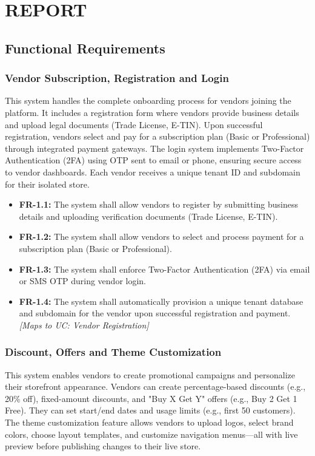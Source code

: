 \chapter{REPORT} \label{ch:procedure}
\section{Functional Requirements}

\subsection{Vendor Subscription, Registration and Login}
This system handles the complete onboarding process for vendors joining the platform. It includes a registration form where vendors provide business details and upload legal documents (Trade License, E-TIN). Upon successful registration, vendors select and pay for a subscription plan (Basic or Professional) through integrated payment gateways. The login system implements Two-Factor Authentication (2FA) using OTP sent to email or phone, ensuring secure access to vendor dashboards. Each vendor receives a unique tenant ID and subdomain for their isolated store.

\begin{itemize}
    \item \textbf{FR-1.1:} The system shall allow vendors to register by submitting business details and uploading verification documents (Trade License, E-TIN).
    \item \textbf{FR-1.2:} The system shall allow vendors to select and process payment for a subscription plan (Basic or Professional).
    \item \textbf{FR-1.3:} The system shall enforce Two-Factor Authentication (2FA) via email or SMS OTP during vendor login.
    \item \textbf{FR-1.4:} The system shall automatically provision a unique tenant database and subdomain for the vendor upon successful registration and payment. \textit{[Maps to UC: Vendor Registration]}
\end{itemize}

\subsection{Discount, Offers and Theme Customization}
This system enables vendors to create promotional campaigns and personalize their storefront appearance. Vendors can create percentage-based discounts (e.g., 20\% off), fixed-amount discounts, and "Buy X Get Y" offers (e.g., Buy 2 Get 1 Free). They can set start/end dates and usage limits (e.g., first 50 customers). The theme customization feature allows vendors to upload logos, select brand colors, choose layout templates, and customize navigation menus—all with live preview before publishing changes to their live store.

